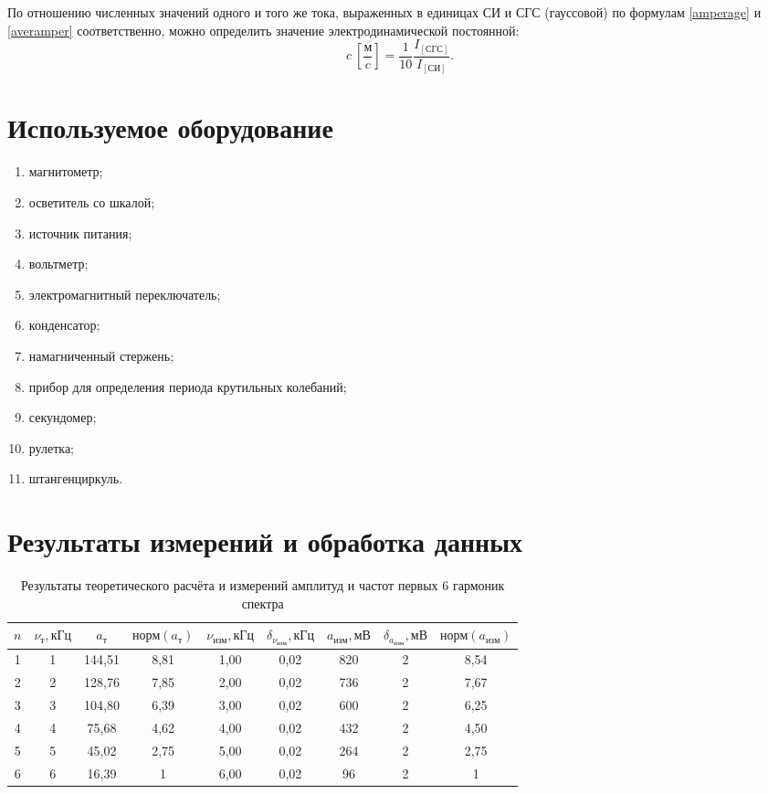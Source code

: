 \documentclass[a4paper, 12pt]{article}
\begin{document}
По отношению численных значений одного и того же тока, выраженных в единицах СИ и СГС (гауссовой) по формулам \eqref{amperage} и \eqref{averamper} соответственно, можно определить значение электродинамической постоянной:
\begin{equation}\label{electroconst}
c~\left[\frac{м}{c}\right] = \frac{1}{10}\frac{I_{[СГС]}}{I_{[СИ]}}.
\end{equation}

\section{Используемое оборудование}

\begin{enumerate}
    \item магнитометр;
    \item осветитель со шкалой;
    \item источник питания;
    \item вольтметр;
    \item электромагнитный переключатель;
    \item конденсатор;
    \item намагниченный стержень;
    \item прибор для определения периода крутильных колебаний;
    \item секундомер;
    \item рулетка;
    \item штангенциркуль.
\end{enumerate}

\section{Результаты измерений и обработка данных}

\begin{table}[h!]
\begin{center}
\begin{tabular}{|c|c|c|c|c|c|c|c|c|}
\hline
$n$ & $\nu_{т}, кГц$ & $a_{т}$ & $норм(a_{т})$ & $\nu_{изм}, кГц$ & $\delta_{\nu_{изм}}, кГц$ & $a_{изм}, мВ$ & $\delta_{a_{изм}}, мВ$ & $норм(a_{изм})$ \\ \hline
1 & 1 & 144,51 & 8,81 & 1,00 & 0,02 & 820 & 2 & 8,54 \\ \hline
2 & 2 & 128,76 & 7,85 & 2,00 & 0,02 & 736 & 2 & 7,67 \\ \hline
3 & 3 & 104,80 & 6,39 & 3,00 & 0,02 & 600 & 2 & 6,25 \\ \hline
4 & 4 & 75,68 & 4,62 & 4,00 & 0,02 & 432 & 2 & 4,50 \\ \hline
5 & 5 & 45,02 & 2,75 & 5,00 & 0,02 & 264 & 2 & 2,75 \\ \hline
6 & 6 & 16,39 & 1 & 6,00 & 0,02 & 96 & 2 & 1 \\ \hline
\end{tabular}
\end{center}
\caption{Результаты теоретического расчёта и измерений амплитуд и частот первых 6 гармоник спектра}
\label{tab1}
\end{table}
\end{document}

